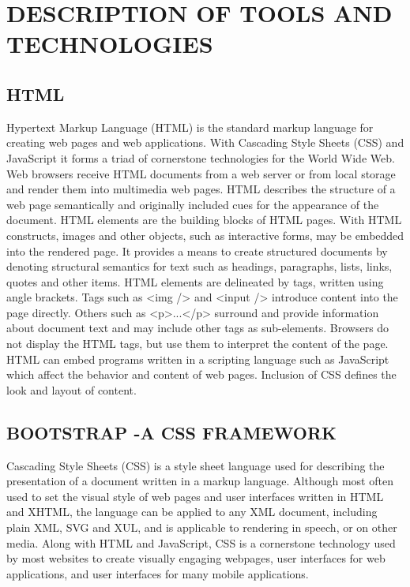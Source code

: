 \chapter{DESCRIPTION OF TOOLS AND TECHNOLOGIES}

\section{HTML}
Hypertext Markup Language (HTML) is the standard markup language for creating web pages and web applications. With Cascading Style Sheets (CSS) and JavaScript it forms a triad of cornerstone technologies for the World Wide Web. Web browsers receive HTML documents from a web server or from local storage and render them into multimedia web pages. HTML describes the structure of a web page semantically and originally included cues for the appearance of the document.
HTML elements are the building blocks of HTML pages. With HTML constructs, images and other objects, such as interactive forms, may be embedded into the rendered page. It provides a means to create structured documents by denoting structural semantics for text such as headings, paragraphs, lists, links, quotes and other items. HTML elements are delineated by tags, written using angle brackets. Tags such as <img /> and <input /> introduce content into the page directly. Others such as <p>...</p> surround and provide information about document text and may include other tags as sub-elements. Browsers do not display the HTML tags, but use them to interpret the content of the page.
HTML can embed programs written in a scripting language such as JavaScript which affect the behavior and content of web pages. Inclusion of CSS defines the look and layout of content. 

\section{BOOTSTRAP -A CSS FRAMEWORK}
Cascading Style Sheets (CSS) is a style sheet language used for describing the presentation of a document written in a markup language. Although most often used to set the visual style of web pages and user interfaces written in HTML and XHTML, the language can be applied to any XML document, including plain XML, SVG and XUL, and is applicable to rendering in speech, or on other media. Along with HTML and JavaScript, CSS is a cornerstone technology used by most websites to create visually engaging webpages, user interfaces for web applications, and user interfaces for many mobile applications.

